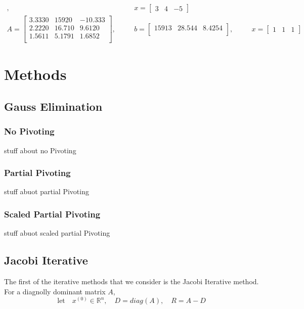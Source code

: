 \documentclass[11pt]{article}	%
\begin{document}
\begin{math}
\begin{alignedat}{3}
        ,&& \quad
        x = \begin{bmatrix}
                3 & 4 & -5
            \end{bmatrix}\\
        A = \begin{bmatrix}
                3.3330 & 15920 & -10.333\\
                2.2220 & 16.710 & 9.6120\\
                1.5611 & 5.1791 & 1.6852\\
            \end{bmatrix}
        ,&& \quad
        b = \begin{bmatrix}
                15913 & 28.544 & 8.4254\\
            \end{bmatrix}
        ,&& \quad
        x = \begin{bmatrix}
                1 & 1 & 1
            \end{bmatrix}
    \end{alignedat}
\end{math}

\section{Methods}

\subsection{Gauss Elimination}

    \subsubsection{No Pivoting}
    stuff about no Pivoting

    \subsubsection{Partial Pivoting}
    stuff abuot partial Pivoting

    \subsubsection{Scaled Partial Pivoting}
    stuff abuot scaled partial Pivoting


\subsection{Jacobi Iterative}
    The first of the iterative methods that we consider is the Jacobi Iterative method. For a diagnolly dominant matrix $A$,
    \begin{equation}\label{eq:jacobi-eq-1-qualifier}
        \textrm{let} \quad x^{(0)}\in {\mathbb R}^n,\quad D = diag(A),\quad R = A - D
    \end{equation}
\end{document}
